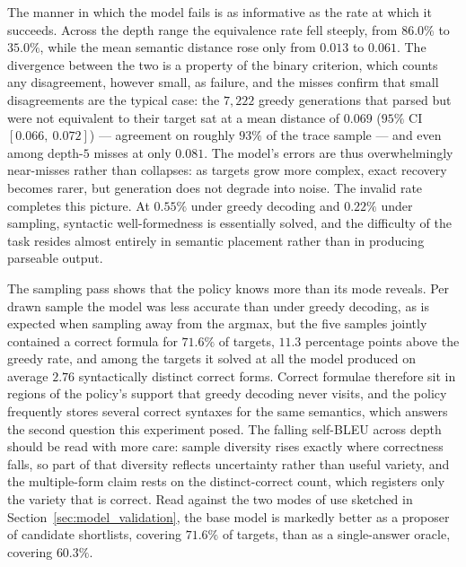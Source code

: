 \documentclass[titlepage,a4paper,11pt]{report}
\begin{document}
    The manner in which the model fails is as informative as the rate at which it succeeds. Across the depth range the equivalence rate fell steeply, from $86.0\%$ to $35.0\%$, while the mean semantic distance rose only from $0.013$ to $0.061$. The divergence between the two is a property of the binary criterion, which counts any disagreement, however small, as failure, and the misses confirm that small disagreements are the typical case: the $7{,}222$ greedy generations that parsed but were not equivalent to their target sat at a mean distance of $0.069$ ($95\%$ CI $[0.066,\ 0.072]$) --- agreement on roughly $93\%$ of the trace sample --- and even among depth-$5$ misses at only $0.081$. The model's errors are thus overwhelmingly near-misses rather than collapses: as targets grow more complex, exact recovery becomes rarer, but generation does not degrade into noise. The invalid rate completes this picture. At $0.55\%$ under greedy decoding and $0.22\%$ under sampling, syntactic well-formedness is essentially solved, and the difficulty of the task resides almost entirely in semantic placement rather than in producing parseable output.
    
    The sampling pass shows that the policy knows more than its mode reveals. Per drawn sample the model was less accurate than under greedy decoding, as is expected when sampling away from the argmax, but the five samples jointly contained a correct formula for $71.6\%$ of targets, $11.3$ percentage points above the greedy rate, and among the targets it solved at all the model produced on average $2.76$ syntactically distinct correct forms. Correct formulae therefore sit in regions of the policy's support that greedy decoding never visits, and the policy frequently stores several correct syntaxes for the same semantics, which answers the second question this experiment posed. The falling self-BLEU across depth should be read with more care: sample diversity rises exactly where correctness falls, so part of that diversity reflects uncertainty rather than useful variety, and the multiple-form claim rests on the distinct-correct count, which registers only the variety that is correct. Read against the two modes of use sketched in Section~\ref{sec:model_validation}, the base model is markedly better as a proposer of candidate shortlists, covering $71.6\%$ of targets, than as a single-answer oracle, covering $60.3\%$.
    
\end{document}
